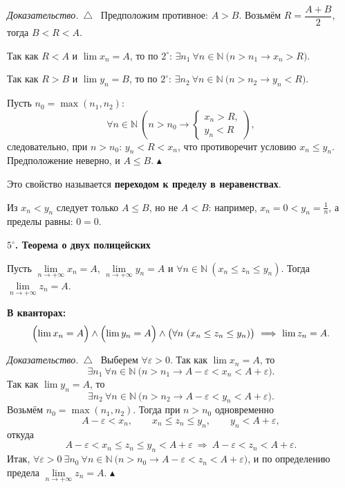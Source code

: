 \documentclass[a4paper,11pt]{article}
\newcommand{\N}{\mathbb{N}}
\newcommand{\eps}{\varepsilon}
\newcommand{\kv}{\par\noindent\textbf{\textcolor{oprc!85!black}{В кванторах:}}}
\newenvironment{dok}
  {\par\smallskip\noindent\textit{Доказательство.}\ $\triangle$\ \ignorespaces}
  {\unskip\nobreak\hfill$\blacktriangle$\par\smallskip}
\newcommand{\podr}[1]{\par\needspace{8\baselineskip}\medskip
  {\large\bfseries\textcolor{oprc!80!black}{#1}}\par\nopagebreak\smallskip}
\begin{document}
\begin{dok}
Предположим противное: $A > B$. Возьмём $R = \dfrac{A + B}{2}$, тогда $B < R < A$.

Так как $R < A$ и $\lim x_n = A$, то по $2^\circ$: $\exists n_1\ \forall n \in \N\ \bigl(n > n_1 \to x_n > R\bigr)$.

Так как $R > B$ и $\lim y_n = B$, то по $2^\circ$: $\exists n_2\ \forall n \in \N\ \bigl(n > n_2 \to y_n < R\bigr)$.

Пусть $n_0 = \max(n_1, n_2)$:
\[
  \forall n \in \N\ \left(n > n_0 \to
  \begin{cases} x_n > R,\\ y_n < R \end{cases}\right),
\]
следовательно, при $n > n_0$: $y_n < R < x_n$, что противоречит условию $x_n \le y_n$.
Предположение неверно, и $A \le B$.
\end{dok}

Это свойство называется \textbf{переходом к пределу в неравенствах}.

\begin{dop}
Из $x_n < y_n$ следует только $A \le B$, но не $A < B$: например, $x_n = 0 < y_n = \frac1n$, а пределы равны: $0 = 0$.
\end{dop}

\podr{$5^\circ$. Теорема о двух полицейских}

\begin{teo}
Пусть $\lim\limits_{n \to +\infty} x_n = A$, $\lim\limits_{n \to +\infty} y_n = A$ и $\forall n \in \N\ (x_n \le z_n \le y_n)$.
Тогда $\lim\limits_{n \to +\infty} z_n = A$.
\kv
\[
  \Bigl(\lim x_n = A\Bigr) \wedge \Bigl(\lim y_n = A\Bigr) \wedge \bigl(\forall n\ (x_n \le z_n \le y_n)\bigr)
  \ \Longrightarrow\ \lim z_n = A.
\]
\end{teo}

\begin{dok}
Выберем $\forall \eps > 0$. Так как $\lim x_n = A$, то
\[
  \exists n_1\ \forall n \in \N\ \bigl(n > n_1 \to A - \eps < x_n < A + \eps\bigr).
\]
Так как $\lim y_n = A$, то
\[
  \exists n_2\ \forall n \in \N\ \bigl(n > n_2 \to A - \eps < y_n < A + \eps\bigr).
\]
Возьмём $n_0 = \max(n_1, n_2)$. Тогда при $n > n_0$ одновременно
\[
  A - \eps < x_n, \qquad x_n \le z_n \le y_n, \qquad y_n < A + \eps,
\]
откуда
\[
  A - \eps < x_n \le z_n \le y_n < A + \eps \ \Longrightarrow\ A - \eps < z_n < A + \eps.
\]
Итак,
$\forall \eps > 0\ \exists n_0\ \forall n \in \N\ \bigl(n > n_0 \to A - \eps < z_n < A + \eps\bigr)$,
и по определению предела $\lim\limits_{n \to +\infty} z_n = A$.
\end{dok}
\end{document}
